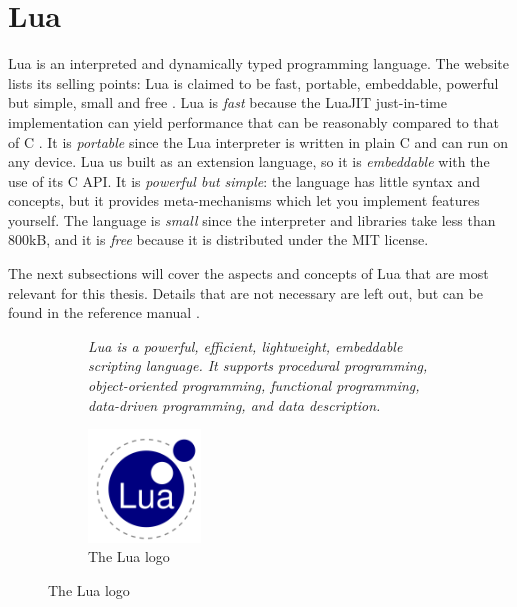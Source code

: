 \section{Lua}\label{section-lua}

Lua is an interpreted and dynamically typed programming language. The website lists its selling points: Lua is claimed to be fast, portable, embeddable, powerful but simple, small and free \cite{luaabout}. Lua is \textit{fast} because the \mbox{LuaJIT} just-in-time implementation can yield performance that can be reasonably compared to that of C \cite[fig. 11]{gualandi2020pallene}. It is \textit{portable} since the Lua interpreter is written in plain C and can run on any device. Lua us built as an extension language, so it is \textit{embeddable} with the use of its C API. It is \textit{powerful but simple}: the language has little syntax and concepts, but it provides meta-mechanisms which let you implement features yourself. The language is \textit{small} since the interpreter and libraries take less than 800kB, and it is \textit{free} because it is distributed under the MIT license.

The next subsections will cover the aspects and concepts of Lua that are most relevant for this thesis. Details that are not necessary are left out, but can be found in the reference manual \cite{luareferencemanual}.

\newenvironment{quotenomargin}{\setlength{\leftmargini}{0em}\quotation}{\endquotation}

\begin{figure}[ht]
    \centering
    \begin{subfigure}{\textwidth-4cm}
        \begin{quotenomargin}
        \noindent
        \textit{Lua is a powerful, efficient, lightweight, embeddable scripting language. It supports procedural programming, object-oriented programming, functional programming, data-driven programming, and data description.}
        \cite{luaabout}
        \end{quotenomargin}
    \end{subfigure}
    \hspace{0.5cm}
    \begin{subfigure}{3cm}
        \includegraphics[width=3cm]{img/lua-256x256.png}
        \caption*{The Lua logo}
    \end{subfigure}
\end{figure}

